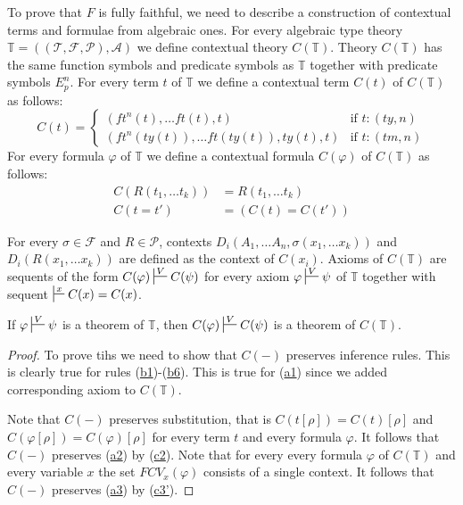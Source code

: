 \documentclass[reqno]{amsart}
\newcommand{\axref}[1]{(\hyperref[ax:#1]{#1})}
\theoremstyle{definition}
\theoremstyle{remark}
\numberwithin{figure}{section}
\begin{document}
To prove that $F$ is fully faithful, we need to describe a construction of contextual terms and formulae from algebraic ones.
For every algebraic type theory $\mathbb{T} = ((\mathcal{T},\mathcal{F},\mathcal{P}),\mathcal{A})$ we define contextual theory $C(\mathbb{T})$.
Theory $C(\mathbb{T})$ has the same function symbols and predicate symbols as $\mathbb{T}$ together with predicate symbols $E^n_p$.
For every term $t$ of $\mathbb{T}$ we define a contextual term $C(t)$ of $C(\mathbb{T})$ as follows:
\[ C(t) =
  \begin{cases}
      (ft^n(t), \ldots ft(t), t) & \text{if } t : (ty,n) \\
      (ft^n(ty(t)), \ldots ft(ty(t)), ty(t), t) & \text{if } t : (tm,n)
  \end{cases}
\]
For every formula $\varphi$ of $\mathbb{T}$ we define a contextual formula $C(\varphi)$ of $C(\mathbb{T})$ as follows:
\begin{align*}
C(R(t_1, \ldots t_k)) & = R(t_1, \ldots t_k) \\
C(t = t') & = (C(t) = C(t'))
\end{align*}

For every $\sigma \in \mathcal{F}$ and $R \in \mathcal{P}$, contexts $D_i(A_1, \ldots A_n, \sigma(x_1, \ldots x_k))$ and $D_i(R(x_1, \ldots x_k))$ are defined as the context of $C(x_i)$.
Axioms of $C(\mathbb{T})$ are sequents of the form $C(\varphi) \sststile{}{V} C(\psi)$ for every axiom $\varphi \sststile{}{V} \psi$ of $\mathbb{T}$
    together with sequent $\sststile{}{x} C(x) = C(x)$.

\begin{lem}
If $\varphi \sststile{}{V} \psi$ is a theorem of $\mathbb{T}$, then $C(\varphi) \sststile{}{V} C(\psi)$ is a theorem of $C(\mathbb{T})$.
\end{lem}
\begin{proof}
To prove tihs we need to show that $C(-)$ preserves inference rules.
This is clearly true for rules \axref{b1}-\axref{b6}.
This is true for \axref{a1} since we added corresponding axiom to $C(\mathbb{T})$.

Note that $C(-)$ preserves substitution, that is $C(t[\rho]) = C(t)[\rho]$ and $C(\varphi[\rho]) = C(\varphi)[\rho]$ for every term $t$ and every formula $\varphi$.
It follows that $C(-)$ preserves \axref{a2} by \axref{c2}.
Note that for every every formula $\varphi$ of $C(\mathbb{T})$ and every variable $x$ the set $FCV_x(\varphi)$ consists of a single context.
It follows that $C(-)$ preserves \axref{a3} by \axref{c3'}.
\end{proof}
\end{document}
